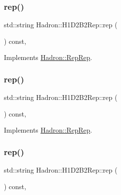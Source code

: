 \subsubsection{\texorpdfstring{rep()}{rep()}\hspace{0.1cm}{\footnotesize\ttfamily [2/5]}}
{\footnotesize\ttfamily std\+::string Hadron\+::\+H1\+D2\+B2\+Rep\+::rep (\begin{DoxyParamCaption}{ }\end{DoxyParamCaption}) const\hspace{0.3cm}{\ttfamily [inline]}, {\ttfamily [virtual]}}



Implements \mbox{\hyperlink{structHadron_1_1RepRep_ab3213025f6de249f7095892109575fde}{Hadron\+::\+Rep\+Rep}}.

\mbox{\label{structHadron_1_1H1D2B2Rep_a12878ffcfbf3732a19b7b27407e4b026}} 
\subsubsection{\texorpdfstring{rep()}{rep()}\hspace{0.1cm}{\footnotesize\ttfamily [3/5]}}
{\footnotesize\ttfamily std\+::string Hadron\+::\+H1\+D2\+B2\+Rep\+::rep (\begin{DoxyParamCaption}{ }\end{DoxyParamCaption}) const\hspace{0.3cm}{\ttfamily [inline]}, {\ttfamily [virtual]}}



Implements \mbox{\hyperlink{structHadron_1_1RepRep_ab3213025f6de249f7095892109575fde}{Hadron\+::\+Rep\+Rep}}.

\mbox{\label{structHadron_1_1H1D2B2Rep_a12878ffcfbf3732a19b7b27407e4b026}} 
\subsubsection{\texorpdfstring{rep()}{rep()}\hspace{0.1cm}{\footnotesize\ttfamily [4/5]}}
{\footnotesize\ttfamily std\+::string Hadron\+::\+H1\+D2\+B2\+Rep\+::rep (\begin{DoxyParamCaption}{ }\end{DoxyParamCaption}) const\hspace{0.3cm}{\ttfamily [inline]}, {\ttfamily [virtual]}}



